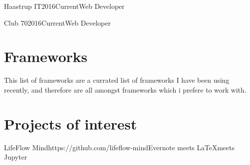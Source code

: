 \begin{cvexp}{Haastrup IT}{2016}{Current}{Web Developer}
\kant[1]
\end{cvexp}

\begin{cvexp}{Club 70}{2016}{Current}{Web Developer}
\kant[1]
\end{cvexp}

\section*{Frameworks}

This list of frameworks are a currated list of frameworks I have been using recently, and therefore are all amongst frameworks which i prefere to work with.\\

\begin{cvskills}
\end{cvskills}

\section*{Projects of interest}
\begin{cvproj}{LifeFlow Mind}{https://github.com/lifeflow-mind}{Evernote meets \LaTeX meets Jupyter}
	\kant[1]
\end{cvproj}
